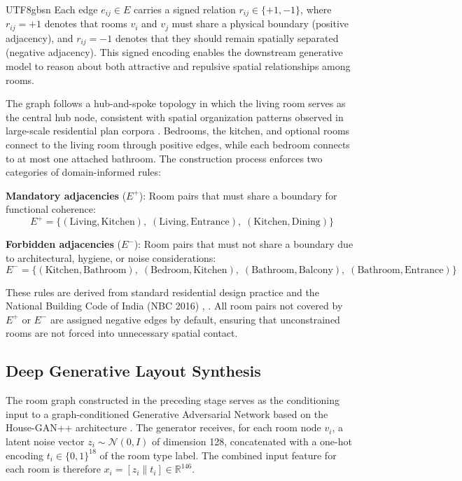 \documentclass[11pt]{article}
\let\cite\citep
\providecommand\citep{\cite}
\begin{document}
\begin{CJK}{UTF8}{gbsn}
Each edge $e_{ij} \in E$ carries a signed relation $r_{ij} \in \{+1, -1\}$, where $r_{ij} = +1$ denotes that rooms $v_i$ and $v_j$ must share a physical boundary (positive adjacency), and $r_{ij} = -1$ denotes that they should remain spatially separated (negative adjacency). This signed encoding enables the downstream generative model to reason about both attractive and repulsive spatial relationships among rooms.

The graph follows a hub-and-spoke topology in which the living room serves as the central hub node, consistent with spatial organization patterns observed in large-scale residential plan corpora \cite{b19}. Bedrooms, the kitchen, and optional rooms connect to the living room through positive edges, while each bedroom connects to at most one attached bathroom. The construction process enforces two categories of domain-informed rules:

\noindent\textbf{Mandatory adjacencies} ($E^{+}$): Room pairs that must share a boundary for functional coherence:
\begin{equation}
E^{+} = \{(\text{Living}, \text{Kitchen}),\; (\text{Living}, \text{Entrance}),\; (\text{Kitchen}, \text{Dining})\}
\end{equation}

\noindent\textbf{Forbidden adjacencies} ($E^{-}$): Room pairs that must not share a boundary due to architectural, hygiene, or noise considerations:
\begin{equation}
E^{-} = \{(\text{Kitchen}, \text{Bathroom}),\; (\text{Bedroom}, \text{Kitchen}),\; (\text{Bathroom}, \text{Balcony}),\; (\text{Bathroom}, \text{Entrance})\}
\end{equation}

These rules are derived from standard residential design practice and the National Building Code of India (NBC 2016) \cite{b2}, \cite{b19}. All room pairs not covered by $E^{+}$ or $E^{-}$ are assigned negative edges by default, ensuring that unconstrained rooms are not forced into unnecessary spatial contact.

\subsection*{Deep Generative Layout Synthesis}

The room graph constructed in the preceding stage serves as the conditioning input to a graph-conditioned Generative Adversarial Network based on the House-GAN++ architecture \cite{b16}. The generator receives, for each room node $v_i$, a latent noise vector $z_i \sim \mathcal{N}(0, I)$ of dimension 128, concatenated with a one-hot encoding $t_i \in \{0, 1\}^{18}$ of the room type label. The combined input feature for each room is therefore $x_i = [z_i \| t_i] \in \mathbb{R}^{146}$.


\end{CJK}
\end{document}

